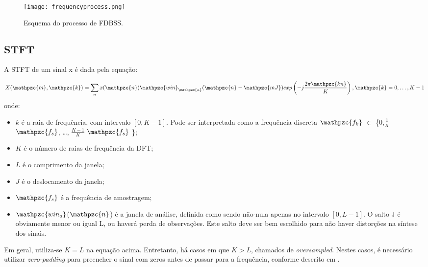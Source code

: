         \begin{figure}[h!]
            \texttt{[image: frequencyprocess.png]}
            \caption{Esquema do processo de FDBSS.}
            \label{fig:frequencymodel}
        \end{figure}

    \subsection{STFT} \label{sec:stft}
        A STFT de um sinal x é dada pela equação:

    \begin{equation}\label{eq:STFT}
        X(\mathpzc{m},\mathpzc{k})
        = \sum_{n} x(\mathpzc{n})
        \mathpzc{win}_\mathpzc{a}(\mathpzc{n} - \mathpzc{mJ})
        exp \left( -j \frac{2\pi\mathpzc{kn}}{K} \right), \mathpzc{k} = 0, \dots, K-1
    \end{equation}
    onde:
    \begin{itemize}
        
        \item $k$ é a raia de frequência, com intervalo $[0, K-1]$. Pode ser interpretada como a frequência discreta $\mathpzc{f_k}$ $\in$ \big\{0,$\frac{1}{K}$ $\mathpzc{f_s}$, \dots, $\frac{K-1}{K}$ $\mathpzc{f_s}$ \big\};
                    
        \item $K$ é o número de raias de frequência da DFT;
                    
        \item $L$ é o comprimento da janela;
                    
        \item $J$ é o deslocamento da janela;
        
        \item  $\mathpzc{f_s}$ é a frequência de amostragem;
        
        \item $\mathpzc{win_a}$($\mathpzc{n}$) é a janela de análise, definida como sendo não-nula apenas no intervalo $[0, L-1]$. O salto J é obviamente menor ou igual L, ou haverá perda de observações. Este salto deve ser bem escolhido para não haver distorções na síntese dos sinais.
    \end{itemize}
    
        Em geral, utiliza-se $K=L$ na equação acima. Entretanto, há casos em que $K>L$, chamados de \textit{oversampled}. Nestes casos, é necessário utilizar \textit{zero-padding} para preencher o sinal com zeros antes de passar para a frequência, conforme descrito em \cite{STFT}.
        
